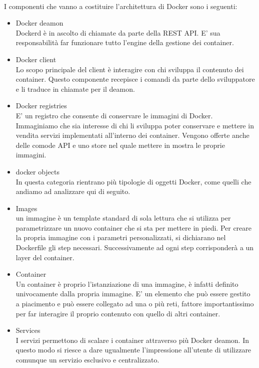 \paragraph{}
I componenti che vanno a costituire l'architettura di Docker sono i seguenti:
\begin{itemize}
	\item Docker deamon \\
	Dockerd è in ascolto di chiamate da parte della REST API. E' sua responsabilità far funzionare tutto l'engine della gestione dei container.
	\item Docker client \\
	Lo scopo principale del client è interagire con chi sviluppa il contenuto dei container. Questo componente recepisce i comandi da parte dello sviluppatore e li traduce in chiamate per il deamon.
	\item Docker registries \\
	E' un registro che consente di conservare le immagini di Docker. Immaginiamo che sia interesse di chi li sviluppa poter conservare e mettere in vendita servizi implementati all'interno dei container. Vengono offerte anche delle comode API e uno store nel quale mettere in mostra le proprie immagini.
	\item  docker objects \\
	In questa categoria rientrano più tipologie di oggetti Docker, come quelli che andiamo ad analizzare qui di seguito.
	\item  Images \\
	un immagine è un template standard di sola lettura che si utilizza per parametrizzare un nuovo container che si sta per mettere in piedi. Per creare la propria immagine  con i parametri personalizzati, si dichiarano nel Dockerfile gli step necessari. Successivamente ad ogni step corrisponderà a un layer del container.
	\item  Container \\
	Un container è proprio l'istanziazione di una immagine, è infatti definito univocamente dalla propria immagine. E' un elemento che può essere gestito a piacimento e può essere collegato ad una o più reti, fattore importantissimo per far interagire il proprio contenuto con quello di altri container.
	\item Services \\
	I servizi permettono di scalare i container attraverso più Docker deamon. In questo modo si riesce a dare ugualmente l'impressione all'utente di utilizzare comunque un servizio esclusivo e centralizzato.
\end{itemize}



